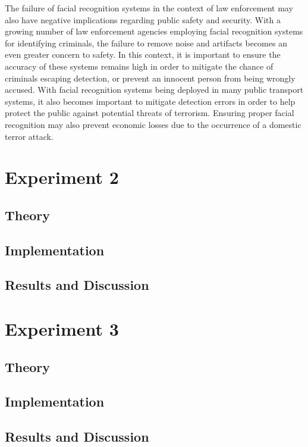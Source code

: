 \documentclass[headings=optiontoheadandtoc,listof=totoc,parskip=full]{scrartcl}
\begin{document}
The failure of facial recognition systems in the context of law enforcement may also have negative implications regarding public safety and security. With a growing number of law enforcement agencies employing facial recognition systems for identifying criminals, the failure to remove noise and artifacts becomes an even greater concern to safety. In this context, it is important to ensure the accuracy of these systems remains high in order to mitigate the chance of criminals escaping detection, or prevent an innocent person from being wrongly accused. With facial recognition systems being deployed in many public transport systems, it also becomes important to mitigate detection errors in order to help protect the public against potential threats of terrorism. Ensuring proper facial recognition may also prevent economic losses due to the occurrence of a domestic terror attack.


\section{Experiment 2}
\label{sec:exp-2}

\subsection{Theory}


\subsection{Implementation}


\subsection{Results and Discussion}


\section{Experiment 3}
\label{sec:exp-3}

\subsection{Theory}


\subsection{Implementation}


\subsection{Results and Discussion}
\end{document}
